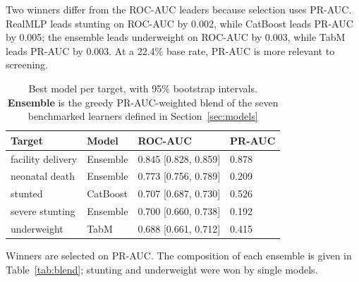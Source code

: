 \documentclass[conference]{IEEEtran}
\begin{document}
Two winners differ from the ROC-AUC leaders because selection uses PR-AUC.
RealMLP leads stunting on ROC-AUC by 0.002, while CatBoost leads PR-AUC by
0.005; the ensemble leads underweight on ROC-AUC by 0.003, while TabM leads
PR-AUC by 0.003. At a 22.4\% base rate, PR-AUC is more relevant to screening.

\begin{table}[t]
\caption{Best model per target, with 95\% bootstrap intervals.
\textnormal{\textbf{Ensemble}} is the greedy PR-AUC-weighted blend of the
seven benchmarked learners defined in Section~\ref{sec:models}}
\label{tab:results}
\centering
\small
\begin{tabular}{@{}llll@{}}
\toprule
\textbf{Target} & \textbf{Model} & \textbf{ROC-AUC} & \textbf{PR-AUC} \\
\midrule
facility delivery & Ensemble & 0.845 [0.828, 0.859] & 0.878 \\
neonatal death & Ensemble & 0.773 [0.756, 0.789] & 0.209 \\
stunted & CatBoost & 0.707 [0.687, 0.730] & 0.526 \\
severe stunting & Ensemble & 0.700 [0.660, 0.738] & 0.192 \\
underweight & TabM & 0.688 [0.661, 0.712] & 0.415 \\
\bottomrule
\end{tabular}
\par\vspace{2pt}\parbox{\columnwidth}{\footnotesize Winners are selected on PR-AUC. The
composition of each ensemble is given in Table~\ref{tab:blend}; stunting and
underweight were won by single models.}
\end{table}
\end{document}
